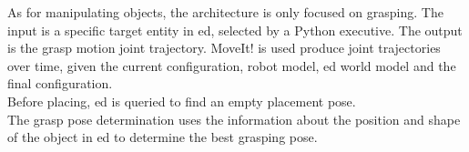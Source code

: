 As for manipulating objects, the architecture is only focused on grasping. The input is a specific target entity in \acrshort{ed}, selected by a Python executive. The output is the grasp motion joint trajectory.
MoveIt! is used produce joint trajectories over time, given the current configuration, robot model, \acrshort{ed} world model and the final configuration.
\\
Before placing, \acrshort{ed} is queried to find an empty placement pose.
\\
The grasp pose determination uses the information about the position and shape of the object in \acrshort{ed} to determine the best grasping pose.
